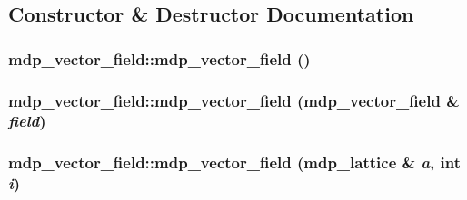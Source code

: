 \subsection{Constructor \& Destructor Documentation}
\hypertarget{classmdp__vector__field_a3900cf2abf276128751407dc0795b312}{
\subsubsection[{mdp\_\-vector\_\-field}]{\setlength{\rightskip}{0pt plus 5cm}mdp\_\-vector\_\-field::mdp\_\-vector\_\-field ()}}
\label{classmdp__vector__field_a3900cf2abf276128751407dc0795b312}
\hypertarget{classmdp__vector__field_ae565296f84d9187b093e4dd9d78577d9}{
\subsubsection[{mdp\_\-vector\_\-field}]{\setlength{\rightskip}{0pt plus 5cm}mdp\_\-vector\_\-field::mdp\_\-vector\_\-field ({\bf mdp\_\-vector\_\-field} \& {\em field})}}
\label{classmdp__vector__field_ae565296f84d9187b093e4dd9d78577d9}
\hypertarget{classmdp__vector__field_ac43a21288e27c78d5bdde212fa9351d2}{
\subsubsection[{mdp\_\-vector\_\-field}]{\setlength{\rightskip}{0pt plus 5cm}mdp\_\-vector\_\-field::mdp\_\-vector\_\-field ({\bf mdp\_\-lattice} \& {\em a}, \/  int {\em i})}}
\label{classmdp__vector__field_ac43a21288e27c78d5bdde212fa9351d2}


